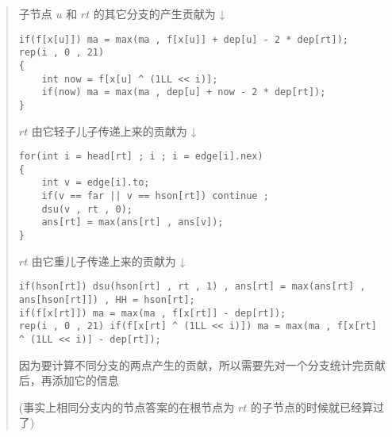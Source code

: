 \documentclass[E:/GsjzTle/main/main.tex]{subfiles}
\begin{document}
\begin{quote}
子节点 \(u\) 和 \(rt\) 的其它分支的产生贡献为 ↓

\begin{lstlisting}
if(f[x[u]]) ma = max(ma , f[x[u]] + dep[u] - 2 * dep[rt]);
rep(i , 0 , 21)
{
	int now = f[x[u] ^ (1LL << i)];
	if(now) ma = max(ma , dep[u] + now - 2 * dep[rt]);
}
\end{lstlisting}

\(rt\) 由它轻子儿子传递上来的贡献为 ↓

\begin{lstlisting}
for(int i = head[rt] ; i ; i = edge[i].nex)
{
	int v = edge[i].to;
	if(v == far || v == hson[rt]) continue ;
	dsu(v , rt , 0);
	ans[rt] = max(ans[rt] , ans[v]);
}
\end{lstlisting}

\(rt\) 由它重儿子传递上来的贡献为 ↓

\begin{lstlisting}
if(hson[rt]) dsu(hson[rt] , rt , 1) , ans[rt] = max(ans[rt] , ans[hson[rt]]) , HH = hson[rt];
if(f[x[rt]]) ma = max(ma , f[x[rt]] - dep[rt]);
rep(i , 0 , 21) if(f[x[rt] ^ (1LL << i)]) ma = max(ma , f[x[rt] ^ (1LL << i)] - dep[rt]);
\end{lstlisting}

因为要计算不同分支的两点产生的贡献，所以需要先对一个分支统计完贡献后，再添加它的信息

(事实上相同分支内的节点答案的在根节点为 \(rt\)
的子节点的时候就已经算过了)
\end{quote}
\end{document}
